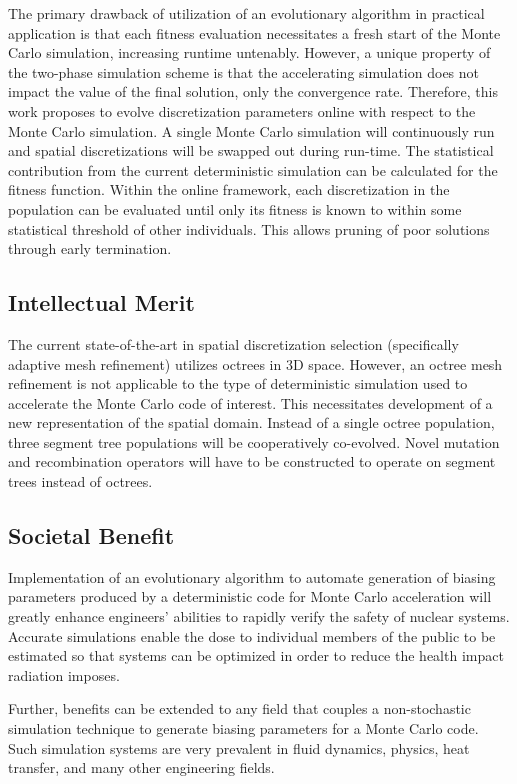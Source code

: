 \documentclass{article}
\begin{document}
The primary drawback of utilization of an evolutionary algorithm in practical application is that each fitness evaluation necessitates a fresh start of the Monte Carlo simulation, increasing runtime untenably. However, a unique property of the two-phase simulation scheme  is that the accelerating simulation does not impact the value of the final solution, only the convergence rate. Therefore, this work proposes to evolve discretization parameters online with respect to the Monte Carlo simulation. A single Monte Carlo simulation will continuously run and spatial discretizations will be swapped out during run-time. The statistical contribution from the current deterministic simulation can be calculated for the fitness function. Within the online framework, each discretization in the population can be evaluated until only its fitness is known to within some statistical threshold of other individuals. This allows pruning of poor solutions through early termination.


\subsection{Intellectual Merit}\label{sec:a4}
The current state-of-the-art in spatial discretization selection (specifically adaptive mesh refinement) utilizes octrees in 3D space. However, an octree mesh refinement is not applicable to the type of deterministic simulation used to accelerate the Monte Carlo code of interest. This necessitates development of a new representation of the spatial domain. Instead of a single octree population, three segment tree populations will be cooperatively co-evolved. Novel mutation and recombination operators will have to be constructed to operate on segment trees instead of octrees.

\subsection{Societal Benefit}\label{sec:a5}
Implementation of an evolutionary algorithm to automate generation of biasing parameters produced by a deterministic code for Monte Carlo acceleration will greatly enhance engineers' abilities to rapidly verify the safety of nuclear systems. Accurate simulations enable the dose to individual members of the public to be estimated so that systems can be optimized in order to reduce the health impact radiation imposes.

Further, benefits can be extended to any field that couples a non-stochastic simulation technique to generate biasing parameters for a Monte Carlo code. Such simulation systems are very prevalent in fluid dynamics, physics, heat transfer, and many other engineering fields.
\end{document}
